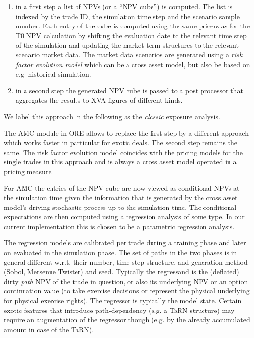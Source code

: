 \documentclass[12pt, a4paper]{article}
\begin{document}
{\begin{appendix}
\begin{enumerate}
\item in a first step a list of NPVs (or a ``NPV cube'') is computed. The list is indexed by the trade ID, the
  simulation time step and the scenario sample number. Each entry of the cube is computed using the same pricers as for
  the T0 NPV calculation by shifting the evaluation date to the relevant time step of the simulation and updating the
  market term structures to the relevant scenario market data. The market data scenarios are generated using a {\em risk
    factor evolution model} which can be a cross asset model, but also be based on e.g. historical simulation.
\item in a second step the generated NPV cube is passed to a post processor that aggregates the results to XVA figures
  of different kinds.
\end{enumerate}

We label this approach in the following as the {\em classic} exposure analysis.

The AMC module in ORE allows to replace the first step by a different approach which works faster in particular for exotic
deals. The second step remains the same. The risk factor evolution model coincides with the pricing models for the
single trades in this approach and is always a cross asset model operated in a pricing measure.

For AMC the entries of the NPV cube are now viewed as conditional NPVs at the simulation time given the information that
is generated by the cross asset model's driving stochastic process up to the simulation time. The conditional
expectations are then computed using a regression analysis of some type. In our current implementation this is chosen to
be a parametric regression analysis.

The regression models are calibrated per trade during a training phase and later on evaluated in the simulation
phase. The set of paths in the two phases is in general different w.r.t. their number, time step structure, and
generation method (Sobol, Mersenne Twister) and seed. Typically the regressand is the (deflated) dirty {\em path} NPV of
the trade in question, or also its underlying NPV or an option continuation value (to take exercise decisions or
represent the physical underlying for physical exercise rights). The regressor is typically the model state. Certain
exotic features that introduce path-dependency (e.g. a TaRN structure) may require an augmentation of the regressor
though (e.g. by the already accumulated amount in case of the TaRN).


\end{appendix}}
\end{document}
